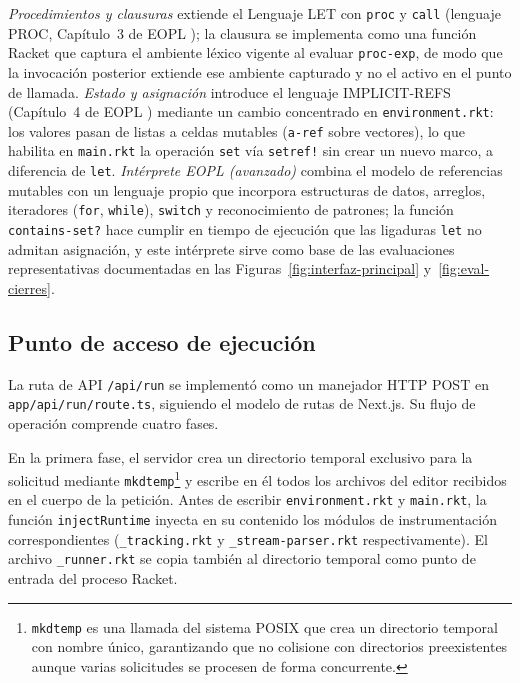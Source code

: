 \textit{Procedimientos y clausuras} extiende el Lenguaje LET con \texttt{proc} y \texttt{call} (lenguaje PROC, Capítulo~3 de EOPL \cite{Friedman2008EPL}); la clausura se implementa como una función Racket que captura el ambiente léxico vigente al evaluar \texttt{proc-exp}, de modo que la invocación posterior extiende ese ambiente capturado y no el activo en el punto de llamada. \textit{Estado y asignación} introduce el lenguaje IMPLICIT-REFS (Capítulo~4 de EOPL \cite{Friedman2008EPL}) mediante un cambio concentrado en \texttt{environment.rkt}: los valores pasan de listas a celdas mutables (\texttt{a-ref} sobre vectores), lo que habilita en \texttt{main.rkt} la operación \texttt{set} vía \texttt{setref!} sin crear un nuevo marco, a diferencia de \texttt{let}. \textit{Intérprete EOPL (avanzado)} combina el modelo de referencias mutables con un lenguaje propio que incorpora estructuras de datos, arreglos, iteradores (\texttt{for}, \texttt{while}), \texttt{switch} y reconocimiento de patrones; la función \texttt{contains-set?} hace cumplir en tiempo de ejecución que las ligaduras \texttt{let} no admitan asignación, y este intérprete sirve como base de las evaluaciones representativas documentadas en las Figuras~\ref{fig:interfaz-principal} y~\ref{fig:eval-cierres}.

\subsection{Punto de acceso de ejecución}

La ruta de API \texttt{/\allowbreak api/\allowbreak run} se implementó como un manejador HTTP POST en \texttt{app/\allowbreak api/\allowbreak run/\allowbreak route.ts}, siguiendo el modelo de rutas de Next.js. Su flujo de operación comprende cuatro fases.

En la primera fase, el servidor crea un directorio temporal exclusivo para la solicitud mediante \texttt{mkdtemp}\footnote{\texttt{mkdtemp} es una llamada del sistema POSIX que crea un directorio temporal con nombre único, garantizando que no colisione con directorios preexistentes aunque varias solicitudes se procesen de forma concurrente.} y escribe en él todos los archivos del editor recibidos en el cuerpo de la petición. Antes de escribir \texttt{environment.rkt} y \texttt{main.rkt}, la función \texttt{inject\allowbreak Runtime} inyecta en su contenido los módulos de instrumentación correspondientes (\texttt{\_tracking.rkt} y \texttt{\_stream-parser.rkt} respectivamente). El archivo \texttt{\_runner.rkt} se copia también al directorio temporal como punto de entrada del proceso Racket.

